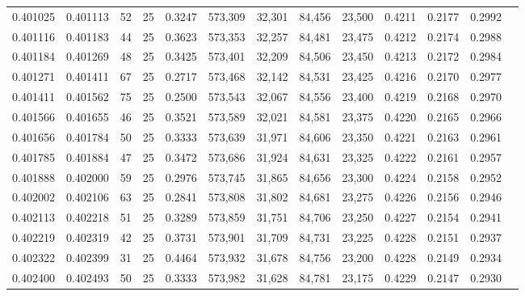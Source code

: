 \begin{tabular}{rrrrrrrrrrrrr}
0.401025 & 0.401113 &    52 &  25 &                                     0.3247 & 573,309 &  32,301 &  84,456 &  23,500 & 0.4211 & 0.2177 & 0.2992 \\
0.401116 & 0.401183 &    44 &  25 &                                     0.3623 & 573,353 &  32,257 &  84,481 &  23,475 & 0.4212 & 0.2174 & 0.2988 \\
0.401184 & 0.401269 &    48 &  25 &                                     0.3425 & 573,401 &  32,209 &  84,506 &  23,450 & 0.4213 & 0.2172 & 0.2984 \\
0.401271 & 0.401411 &    67 &  25 &                                     0.2717 & 573,468 &  32,142 &  84,531 &  23,425 & 0.4216 & 0.2170 & 0.2977 \\
0.401411 & 0.401562 &    75 &  25 &                                     0.2500 & 573,543 &  32,067 &  84,556 &  23,400 & 0.4219 & 0.2168 & 0.2970 \\
0.401566 & 0.401655 &    46 &  25 &                                     0.3521 & 573,589 &  32,021 &  84,581 &  23,375 & 0.4220 & 0.2165 & 0.2966 \\
0.401656 & 0.401784 &    50 &  25 &                                     0.3333 & 573,639 &  31,971 &  84,606 &  23,350 & 0.4221 & 0.2163 & 0.2961 \\
0.401785 & 0.401884 &    47 &  25 &                                     0.3472 & 573,686 &  31,924 &  84,631 &  23,325 & 0.4222 & 0.2161 & 0.2957 \\
0.401888 & 0.402000 &    59 &  25 &                                     0.2976 & 573,745 &  31,865 &  84,656 &  23,300 & 0.4224 & 0.2158 & 0.2952 \\
0.402002 & 0.402106 &    63 &  25 &                                     0.2841 & 573,808 &  31,802 &  84,681 &  23,275 & 0.4226 & 0.2156 & 0.2946 \\
0.402113 & 0.402218 &    51 &  25 &                                     0.3289 & 573,859 &  31,751 &  84,706 &  23,250 & 0.4227 & 0.2154 & 0.2941 \\
0.402219 & 0.402319 &    42 &  25 &                                     0.3731 & 573,901 &  31,709 &  84,731 &  23,225 & 0.4228 & 0.2151 & 0.2937 \\
0.402322 & 0.402399 &    31 &  25 &                                     0.4464 & 573,932 &  31,678 &  84,756 &  23,200 & 0.4228 & 0.2149 & 0.2934 \\
0.402400 & 0.402493 &    50 &  25 &                                     0.3333 & 573,982 &  31,628 &  84,781 &  23,175 & 0.4229 & 0.2147 & 0.2930 \\

\end{tabular}
